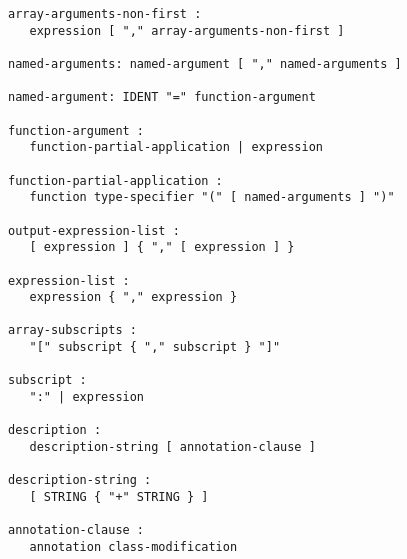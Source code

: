 \begin{lstlisting}[language=grammar]
array-arguments-non-first :
   expression [ "," array-arguments-non-first ]

named-arguments: named-argument [ "," named-arguments ]

named-argument: IDENT "=" function-argument

function-argument :
   function-partial-application | expression

function-partial-application :
   function type-specifier "(" [ named-arguments ] ")"

output-expression-list :
   [ expression ] { "," [ expression ] }

expression-list :
   expression { "," expression }

array-subscripts :
   "[" subscript { "," subscript } "]"

subscript :
   ":" | expression

description :
   description-string [ annotation-clause ]

description-string :
   [ STRING { "+" STRING } ]

annotation-clause :
   annotation class-modification
\end{lstlisting}
